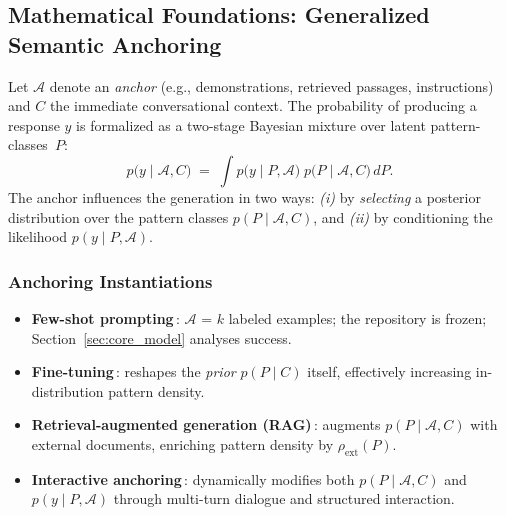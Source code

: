 \subsection{Mathematical Foundations: Generalized Semantic Anchoring}
\label{sec:UCCT_mathematical_foundations}
Let $\mathcal{A}$ denote an \emph{anchor} (e.g., demonstrations, retrieved
passages, instructions) and $C$ the immediate conversational context.  The
probability of producing a response $y$ is formalized as a two-stage
Bayesian mixture over latent pattern-classes~$P$:
\begin{equation}
\label{eq:ucct-general}
p\!\bigl(y \mid \mathcal{A}, C\bigr)
\;=\;
\int
  p\!\bigl(y \mid P, \mathcal{A}\bigr)\;
  p\!\bigl(P \mid \mathcal{A}, C\bigr)
\, dP.
\end{equation}
The anchor influences the generation in two ways:
\textit{(i)} by \emph{selecting} a posterior distribution over
the pattern classes $p(P\mid\mathcal{A},C)$, and
\textit{(ii)} by conditioning the likelihood
$p(y\mid P,\mathcal{A})$.

\subsubsection{Anchoring Instantiations}
\label{sec:anchoring_instantiations}
\begin{itemize}[leftmargin=1.4em,itemsep=2pt]
  \item \textbf{Few-shot prompting}\,: $\mathcal{A}$ = $k$ labeled examples;
        the repository is frozen; Section~\ref{sec:core_model} analyses success.
  \item \textbf{Fine-tuning}\,: reshapes the \emph{prior}
        $p(P\mid C)$ itself, effectively increasing in-distribution
        pattern density.
  \item \textbf{Retrieval-augmented generation (RAG)}\,: augments
        $p(P\mid\mathcal{A},C)$ with external documents, enriching
        pattern density by $\rho_{\text{ext}}(P)$.
  \item \textbf{Interactive anchoring}\,: dynamically modifies both
        $p(P\mid\mathcal{A},C)$ and $p(y\mid P,\mathcal{A})$ through
        multi-turn dialogue and structured interaction.
\end{itemize}

